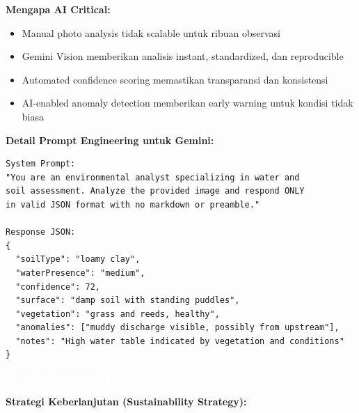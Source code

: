 \documentclass[12pt,a4paper]{article}
\newcommand{\sectionbox}[1]{%
  \colorbox{samsungblue}{%
    \parbox{\textwidth}{%
      \textcolor{white}{\large\bfseries #1}%
    }%
  }%
}
\newcommand{\subsectionbox}[1]{%
  \textbf{\large #1}\\[0.3cm]
}
\begin{document}
\subsectionbox{Mengapa AI Critical:}

\begin{itemize}
  \item Manual photo analysis tidak scalable untuk ribuan observasi
  \item Gemini Vision memberikan analisis instant, standardized, dan reproducible
  \item Automated confidence scoring memastikan transparansi dan konsistensi
  \item AI-enabled anomaly detection memberikan early warning untuk kondisi tidak biasa
\end{itemize}

\subsectionbox{Detail Prompt Engineering untuk Gemini:}

\begin{verbatim}
System Prompt:
"You are an environmental analyst specializing in water and 
soil assessment. Analyze the provided image and respond ONLY 
in valid JSON format with no markdown or preamble."

Response JSON:
{
  "soilType": "loamy clay",
  "waterPresence": "medium",
  "confidence": 72,
  "surface": "damp soil with standing puddles",
  "vegetation": "grass and reeds, healthy",
  "anomalies": ["muddy discharge visible, possibly from upstream"],
  "notes": "High water table indicated by vegetation and conditions"
}
\end{verbatim}

\vspace{1cm}

\sectionbox{11. SUSTAINABILITY}

\vspace{0.5cm}

\subsectionbox{Strategi Keberlanjutan (Sustainability Strategy):}
\end{document}
